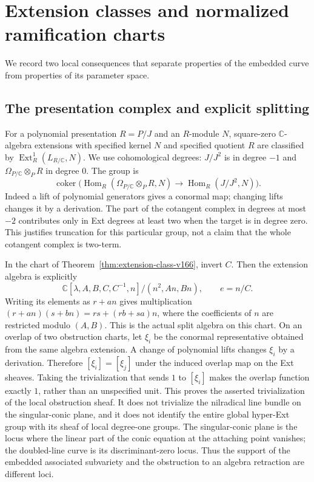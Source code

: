 \documentclass[11pt,reqno]{amsart}
\numberwithin{equation}{section}
\theoremstyle{definition}\newtheorem{definition}[theorem]{Definition}
\theoremstyle{remark}\newtheorem{remark}[theorem]{Remark}
\newcommand{\C}{\mathbb C}\newcommand{\Q}{\mathbb Q}
\DeclareMathOperator{\Hom}{Hom}\DeclareMathOperator{\Tot}{Tot}
\DeclareMathOperator{\coker}{coker}\DeclareMathOperator{\codim}{codim}
\begin{document}
\appendix
\section{Extension classes and normalized ramification charts}
\label{sec:local-algebra-v167}
We record two local consequences that separate properties of the
embedded curve from properties of its parameter space.

\subsection{The presentation complex and explicit splitting}
For a polynomial presentation $R=P/J$ and an $R$-module $N$,
square-zero $\C$-algebra extensions with specified kernel $N$
and specified quotient $R$ are classified by
$\operatorname{Ext}^1_R(L_{R/\C},N)$. We use cohomological degrees:
$J/J^2$ is in degree $-1$ and
$\Omega_{P/\C}\otimes_PR$ in degree $0$. The group is
\[
 \coker\bigl(\Hom_R(\Omega_{P/\C}\otimes_PR,N)
                       \longrightarrow\Hom_R(J/J^2,N)\bigr).
\]
Indeed a lift of polynomial generators gives a conormal map;
changing lifts changes it by a derivation. The part of the
cotangent complex in degrees at most $-2$ contributes only in
Ext degrees at least two when the target is in degree zero.
This justifies truncation for this particular group, not a claim
that the whole cotangent complex is two-term.

In the chart of Theorem~\ref{thm:extension-class-v166}, invert $C$.
Then the extension algebra is explicitly
\[
 \C[\lambda,A,B,C,C^{-1},n]/(n^2,An,Bn),\qquad e=n/C.
\]
Writing its elements as $r+an$ gives multiplication
$(r+an)(s+bn)=rs+(rb+sa)n$, where the coefficients of $n$ are
restricted modulo $(A,B)$. This is the actual split algebra on
this chart. On an overlap of two obstruction charts, let $\xi_i$
be the conormal representative obtained from the same algebra
extension. A change of polynomial lifts changes $\xi_i$ by a
derivation. Therefore $[\xi_i]=[\xi_j]$ under the induced overlap
map on the Ext sheaves. Taking the trivialization that sends
$1$ to $[\xi_i]$ makes the overlap function exactly $1$, rather
than an unspecified unit. This proves the asserted trivialization
of the local obstruction sheaf. It does not trivialize the
nilradical line bundle on the singular-conic plane, and it does
not identify the entire global hyper-Ext group with its sheaf of
local degree-one groups. The singular-conic plane is the locus
where the linear part of the conic equation at the attaching
point vanishes; the doubled-line curve is its discriminant-zero
locus. Thus the support of the embedded associated subvariety
and the obstruction to an algebra retraction are different loci.
\end{document}
